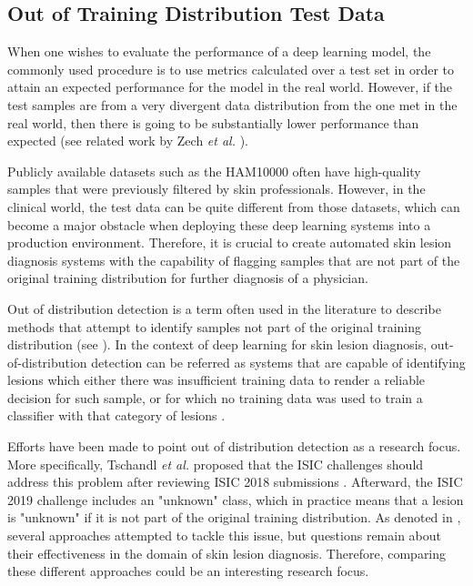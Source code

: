     \subsection{Out of Training Distribution Test Data}
    When one wishes to evaluate the performance of a deep learning model, the commonly used procedure is to use metrics calculated over a test set in order to attain an expected performance for the model in the real world. However, if the test samples are from a very divergent data distribution from the one met in the real world, then there is going to be substantially lower performance than expected (see related work by Zech \textit{et al.} \cite{Zech2018}). \par 
    
    Publicly available datasets such as the \ac{HAM10000} \cite{ham10000} often have high-quality samples that were previously filtered by skin professionals. However, in the clinical world, the test data can be quite different from those datasets, which can become a major obstacle when deploying these deep learning systems into a production environment. Therefore, it is crucial to create automated skin lesion diagnosis systems with the capability of flagging samples that are not part of the original training distribution for further diagnosis of a physician. \par
    
    Out of distribution detection is a term often used in the literature to describe methods that attempt to identify samples not part of the original training distribution (see ). In the context of deep learning for skin lesion diagnosis, out-of-distribution detection can be referred as systems that are capable of identifying lesions which either there was insufficient training data to render a reliable decision for such sample, or for which no training data was used to train a classifier with that category of lesions \cite{Celebi2019}. \par 

    Efforts have been made to point out of distribution detection as a research focus. More specifically, Tschandl \textit{et al.} proposed that the \ac{ISIC} challenges should address this problem after reviewing \ac{ISIC} 2018 submissions \cite{humanvsisic2018}. Afterward, the \ac{ISIC} 2019 challenge includes an "unknown" class, which in practice means that a lesion is "unknown" if it is not part of the original training distribution. As denoted in , several approaches attempted to tackle this issue, but questions remain about their effectiveness in the domain of skin lesion diagnosis. Therefore, comparing these different approaches could be an interesting research focus. \par
    

